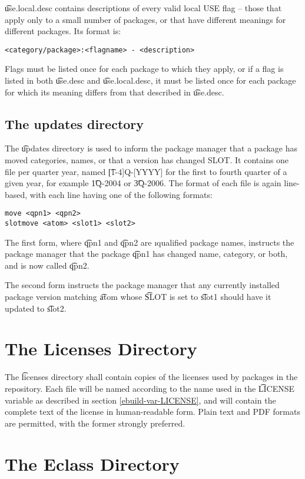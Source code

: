 \t{use.local.desc} contains descriptions of every valid local USE flag -- those that apply only to a
small number of packages, or that have different meanings for different packages. Its format is:
\begin{verbatim}
<category/package>:<flagname> - <description>
\end{verbatim}
Flags must be listed once for each package to which they apply, or if a flag is listed in both
\t{use.desc} and \t{use.local.desc}, it must be listed once for each package for which its meaning
differs from that described in \t{use.desc}.

\subsection{The updates directory}
\label{updates-dir}
The \t{updates} directory is used to inform the package manager that a package has moved categories,
names, or that a version has changed SLOT. It contains one file per quarter year, named
\t{[1-4]Q-[YYYY]} for the first to fourth quarter of a given year, for example \t{1Q-2004} or
\t{3Q-2006}. The format of each file is again line-based, with each line having one of the following
formats:
\begin{verbatim}
move <qpn1> <qpn2>
slotmove <atom> <slot1> <slot2>
\end{verbatim}
The first form, where \t{qpn1} and \t{qpn2} are \i{qualified package names}, instructs the package
manager that the package \t{qpn1} has changed name, category, or both, and is now called \t{qpn2}.

The second form instructs the package manager that any currently installed package version matching
\t{atom} whose \t{SLOT} is set to \t{slot1} should have it updated to \t{slot2}.


\section{The Licenses Directory}
\label{licenses-dir}

The \t{licenses} directory shall contain copies of the licenses used by packages in the
repository. Each file will be named according to the name used in the \t{LICENSE} variable as
described in section \ref{ebuild-var-LICENSE}, and will contain the complete text of the license in
human-readable form. Plain text and PDF formats are permitted, with the former strongly preferred.

\section{The Eclass Directory}
\label{eclass-dir}

